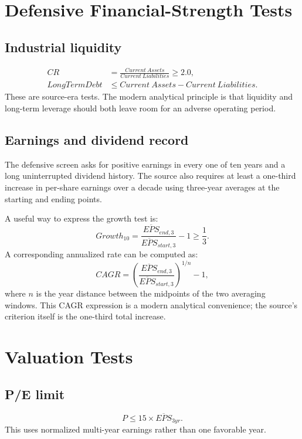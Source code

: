 \documentclass[11pt]{article}
\begin{document}
\section{Defensive Financial-Strength Tests}
\subsection{Industrial liquidity}
\begin{align}
CR &= \frac{Current\ Assets}{Current\ Liabilities}\ge 2.0,\\
LongTermDebt &\le Current\ Assets-Current\ Liabilities.
\end{align}
These are source-era tests. The modern analytical principle is that liquidity and long-term leverage should both leave room for an adverse operating period.

\subsection{Earnings and dividend record}
The defensive screen asks for positive earnings in every one of ten years and a long uninterrupted dividend history. The source also requires at least a one-third increase in per-share earnings over a decade using three-year averages at the starting and ending points.

A useful way to express the growth test is:
\begin{equation}
Growth_{10}=\frac{\overline{EPS}_{end,3}}{\overline{EPS}_{start,3}}-1 \ge \frac{1}{3}.
\end{equation}
A corresponding annualized rate can be computed as:
\begin{equation}
CAGR=\left(\frac{\overline{EPS}_{end,3}}{\overline{EPS}_{start,3}}\right)^{1/n}-1,
\end{equation}
where $n$ is the year distance between the midpoints of the two averaging windows. This CAGR expression is a modern analytical convenience; the source's criterion itself is the one-third total increase.

\section{Valuation Tests}
\subsection{P/E limit}
\begin{equation}
P \le 15\times \overline{EPS}_{3yr}.
\end{equation}
This uses normalized multi-year earnings rather than one favorable year.
\end{document}
